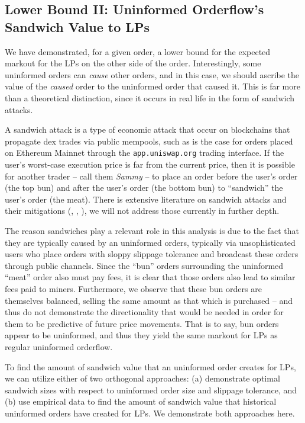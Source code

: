 \subsection{Lower Bound II: Uninformed Orderflow's Sandwich Value to LPs} \label{subsection:sandwich-value-to-lps}
    We have demonstrated, for a given order, a lower bound for the expected markout for the LPs on the other side of the order. Interestingly, some uninformed orders can \textit{cause} other orders, and in this case, we should ascribe the value of the \textit{caused} order to the uninformed order that caused it. This is far more than a theoretical distinction, since it occurs in real life in the form of sandwich attacks.

    A sandwich attack is a type of economic attack that occur on blockchains that propagate dex trades via public mempools, such as is the case for orders placed on Ethereum Mainnet through the \texttt{app.uniswap.org} trading interface. If the user's worst-case execution price is far from the current price, then it is possible for another trader -- call them \textit{Sammy} -- to place an order before the user's order (the top bun) and after the user's order (the bottom bun) to ``sandwich'' the user's order (the meat). There is extensive literature on sandwich attacks and their mitigations (\cite{kulkarni2022towards}, \cite{zust2021analyzing}, \cite{zhou2021high}), we will not address those currently in further depth.
    
    The reason sandwiches play a relevant role in this analysis is due to the fact that they are typically caused by an uninformed orders, typically via unsophisticated users who place orders with sloppy slippage tolerance and broadcast these orders through public channels. Since the ``bun'' orders surrounding the uninformed ``meat'' order also must pay fees, it is clear that those orders also lead to similar fees paid to miners. Furthermore, we observe that these bun orders are themselves balanced, selling the same amount as that which is purchased -- and thus do not demonstrate the directionality that would be needed in order for them to be predictive of future price movements. That is to say, bun orders appear to be uninformed, and thus they yield the same markout for LPs as regular uninformed orderflow.

    To find the amount of sandwich value that an uninformed order creates for LPs, we can utilize either of two orthogonal approaches: (a) demonstrate optimal sandwich sizes with respect to uninformed order size and slippage tolerance, and (b) use empirical data to find the amount of sandwich value that historical uninformed orders have created for LPs. We demonstrate both approaches here.

